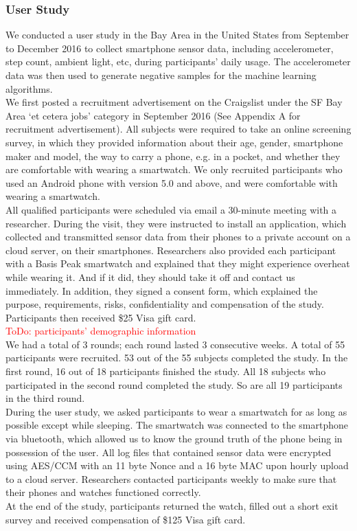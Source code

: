 \subsubsection{User Study}
We conducted a user study in the Bay Area in the United States from September to December 2016 to collect smartphone sensor data, including accelerometer, step count, ambient light, etc, during participants' daily usage. The accelerometer data was then used to generate negative samples for the machine learning algorithms. \\
We first posted a recruitment advertisement on the Craigslist under the SF Bay Area `et cetera jobs' category in September 2016 (See Appendix A for recruitment advertisement). All subjects were required to take an online screening survey, in which they provided information about their age, gender, smartphone maker and model, the way to carry a phone, e.g. in a pocket, and whether they are comfortable with wearing a smartwatch. We only recruited participants who used an Android phone with version 5.0 and above, and were comfortable with wearing a smartwatch. \\
All qualified participants were scheduled via email a 30-minute meeting with a researcher. During the visit, they were instructed to install an application, which collected and transmitted sensor data from their phones to a private account on a cloud server, on their smartphones. Researchers also provided each participant with a Basis Peak smartwatch and explained that they might experience overheat while wearing it. And if it did, they should take it off and contact us immediately. In addition, they signed a consent form, which explained the purpose, requirements, risks, confidentiality and compensation of the study. Participants then received \$25 Visa gift card. \\
\textcolor{red}{ToDo: participants' demographic information} \\
We had a total of 3 rounds; each round lasted 3 consecutive weeks. A total of 55 participants were recruited. 53 out of the 55 subjects completed the study. In the first round, 16 out of 18 participants finished the study. All 18 subjects who participated in the second round completed the study. So are all 19 participants in the third round. \\
During the user study, we asked participants to wear a smartwatch for as long as possible except while sleeping. The smartwatch was connected to the smartphone via bluetooth, which allowed us to know the ground truth of the phone being in possession of the user. All log files that contained sensor data were encrypted using AES/CCM with an 11 byte Nonce and a 16 byte MAC upon hourly upload to a cloud server. Researchers contacted participants weekly to make sure that their phones and watches functioned correctly. \\
At the end of the study, participants returned the watch, filled out a short exit survey and received compensation of \$125 Visa gift card.

